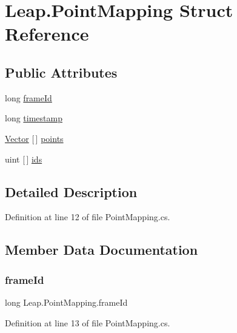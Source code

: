 \hypertarget{struct_leap_1_1_point_mapping}{}\section{Leap.\+Point\+Mapping Struct Reference}
\label{struct_leap_1_1_point_mapping}
\subsection*{Public Attributes}
\begin{DoxyCompactItemize}
\item 
long \mbox{\hyperlink{struct_leap_1_1_point_mapping_a2265028994139d659aab879938d09d92}{frame\+Id}}
\item 
long \mbox{\hyperlink{struct_leap_1_1_point_mapping_a3206170d16cbb4470c7439faeff0c003}{timestamp}}
\item 
\mbox{\hyperlink{struct_leap_1_1_vector}{Vector}} \mbox{[}$\,$\mbox{]} \mbox{\hyperlink{struct_leap_1_1_point_mapping_a017c93574f1f8e05f60094ba4060ca8b}{points}}
\item 
uint \mbox{[}$\,$\mbox{]} \mbox{\hyperlink{struct_leap_1_1_point_mapping_aee8484f8049fce64ae4198ee1dc02c5a}{ids}}
\end{DoxyCompactItemize}


\subsection{Detailed Description}


Definition at line 12 of file Point\+Mapping.\+cs.



\subsection{Member Data Documentation}
\mbox{\label{struct_leap_1_1_point_mapping_a2265028994139d659aab879938d09d92}} 
\subsubsection{\texorpdfstring{frameId}{frameId}}
{\footnotesize\ttfamily long Leap.\+Point\+Mapping.\+frame\+Id}



Definition at line 13 of file Point\+Mapping.\+cs.

